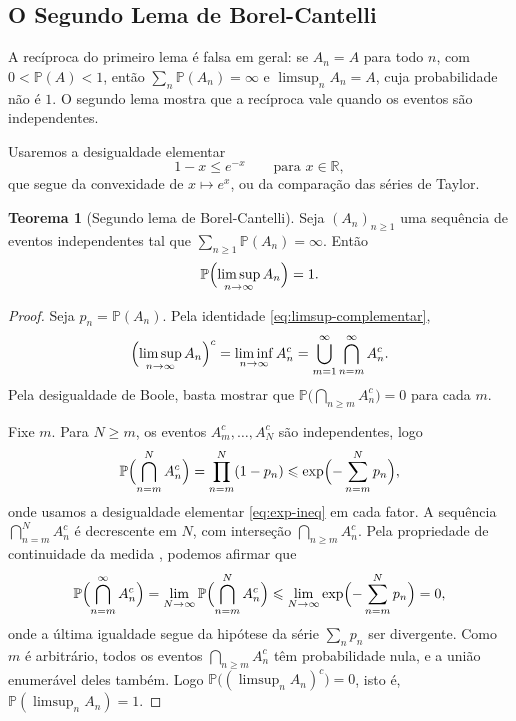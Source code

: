 \documentclass[12pt,portuguese]{article}
\theoremstyle{definition}
\newtheorem{theorem}{Teorema}
\theoremstyle{plainexercise}
\theoremstyle{starredexercise}
\theoremstyle{definition}
\begin{document}
\subsection{O Segundo Lema de Borel-Cantelli}\label{subsec:bc2}

A recíproca do primeiro lema é falsa em geral: se $A_n=A$ para todo $n$, com
$0<\mathbb{P}(A)<1$, então $\sum_n\mathbb{P}(A_n)=\infty$ e
$\limsup_n A_n=A$, cuja probabilidade não é $1$. O segundo lema mostra que a
recíproca vale quando os eventos são independentes.

Usaremos a desigualdade elementar
\begin{equation}\label{eq:exp-ineq}
1-x\leqslant e^{-x}
\qquad
\text{para }x\in\mathbb{R},
\end{equation}
que segue da convexidade de $x\longmapsto e^x$, ou da comparação das séries de
Taylor.

\begin{theorem}[Segundo lema de Borel-Cantelli]\label{thm:bc2}
Seja $(A_n)_{n\geqslant1}$ uma sequência de eventos independentes tal que
$\sum_{n\geqslant1}\mathbb{P}(A_n)=\infty$. Então
\[
\mathbb{P}\Bigl(\limsup_{n\to\infty}A_n\Bigr)=1.
\]
\end{theorem}

\begin{proof}
Seja $p_n=\mathbb{P}(A_n)$. Pela identidade \eqref{eq:limsup-complementar},
\[
\Bigl(\limsup_{n\to\infty}A_n\Bigr)^c
=
\liminf_{n\to\infty}A_n^c
=
\bigcup_{m=1}^{\infty}\bigcap_{n=m}^{\infty}A_n^c.
\]
Pela desigualdade de Boole, basta mostrar que
$\mathbb{P}\bigl(\bigcap_{n\geqslant m}A_n^c\bigr)=0$ para cada $m$.

Fixe $m$. Para $N\geqslant m$, os eventos $A_m^c,\ldots,A_N^c$ são
independentes, logo
\[
\mathbb{P}\Bigl(\bigcap_{n=m}^{N}A_n^c\Bigr)
=
\prod_{n=m}^{N}(1-p_n)
\leqslant
\exp\Bigl(-\sum_{n=m}^{N}p_n\Bigr),
\]
onde usamos a desigualdade elementar \eqref{eq:exp-ineq} em cada fator. A sequência
$\bigcap_{n=m}^{N}A_n^c$ é decrescente em $N$, com interseção
$\bigcap_{n\geqslant m}A_n^c$. Pela propriedade de continuidade da medida
, podemos afirmar que
\[
\mathbb{P}\Bigl(\bigcap_{n=m}^{\infty}A_n^c\Bigr)
=
\lim_{N\to\infty}\mathbb{P}\Bigl(\bigcap_{n=m}^{N}A_n^c\Bigr)
\leqslant
\lim_{N\to\infty}\exp\Bigl(-\sum_{n=m}^{N}p_n\Bigr)
=
0,
\]
onde a última igualdade segue da hipótese da série $\sum_n p_n$ ser divergente. 
Como $m$ é arbitrário, todos os eventos
$\bigcap_{n\geqslant m}A_n^c$ têm probabilidade nula, e a união enumerável
deles também. Logo $\mathbb{P}\bigl((\limsup_n A_n)^c\bigr)=0$, isto é,
$\mathbb{P}(\limsup_n A_n)=1$.
\end{proof}
\end{document}
